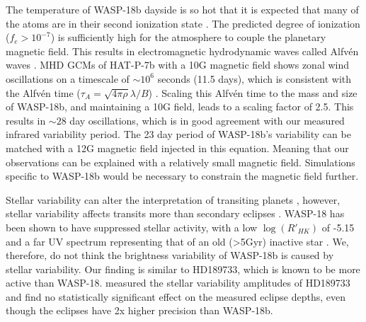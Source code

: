 The temperature of WASP-18b dayside is so hot that it is expected that many of the atoms are in their second ionization state \citep{Helling2019a}. The predicted degree of ionization ($f_e > 10^{-7}$) is sufficiently high for the atmosphere to couple the planetary magnetic field. This results in electromagnetic hydrodynamic waves called Alfv\'en waves \citep{Alfven1942}. MHD GCMs of HAT-P-7b with a 10G magnetic field shows zonal wind oscillations on a timescale of $\sim10^6$ seconds (11.5 days), which is consistent with the Alfv\'en time ($\tau_A=\sqrt{4\pi\rho}\lambda/B$) \citep{Rogers2017}. Scaling this Alfv\'en time to the mass and size of WASP-18b, and maintaining a 10G field, leads to a scaling factor of 2.5. This results in $\sim28$ day oscillations, which is in good agreement with our measured infrared variability period. The 23 day period of WASP-18b's variability can be matched with a 12G magnetic field injected in this equation. Meaning that our observations can be explained with a relatively small magnetic field. Simulations specific to WASP-18b would be necessary to constrain the magnetic field further.




Stellar variability can alter the interpretation of transiting planets \citep[e.g.,][]{Pont2008, Oshagh2014, Desert2011d}, however, stellar variability affects transits more than secondary eclipses \citep{Zellem2017}. WASP-18 has been shown to have suppressed stellar activity, with a low $\log(R'_{HK})$ of -5.15 \citep{Lanza2014} and a far UV spectrum representing that of an old (>5Gyr) inactive star \citep{Fossati2018}. We, therefore, do not think the brightness variability of WASP-18b is caused by stellar variability. Our finding is similar to HD189733, which is known to be more active than WASP-18. \citet{Kilpatrick2020} measured the stellar variability amplitudes of HD189733 and find no statistically significant effect on the measured eclipse depths, even though the eclipses have 2x higher precision than WASP-18b.

